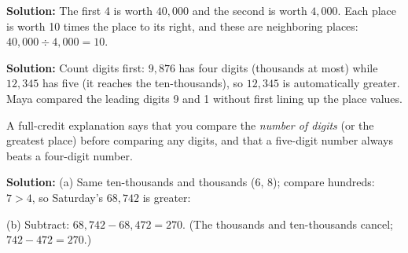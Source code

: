 \documentclass[12pt]{article}
\begin{document}

\textbf{Solution:} The first 4 is worth $40{,}000$ and the second is worth
$4{,}000$. Each place is worth 10 times the place to its right, and these are
neighboring places: $40{,}000 \div 4{,}000 = 10$. 


\textbf{Solution:} Count digits first: $9{,}876$ has four digits (thousands at
most) while $12{,}345$ has five (it reaches the ten-thousands), so $12{,}345$ is
automatically greater. Maya compared the leading digits 9 and 1 without first
lining up the place values. 

A full-credit explanation says that you compare the \emph{number of digits} (or
the greatest place) before comparing any digits, and that a five-digit number
always beats a four-digit number.


\textbf{Solution:} (a) Same ten-thousands and thousands (6, 8); compare
hundreds: $7 > 4$, so Saturday's $68{,}742$ is greater:

(b) Subtract: $68{,}742 - 68{,}472 = 270$. (The thousands and ten-thousands
cancel; $742 - 472 = 270$.) 
\end{document}
